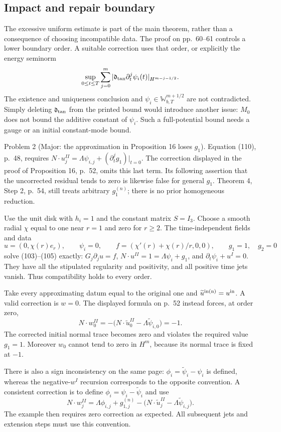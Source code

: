 \documentclass[10pt]{article}
\begin{document}
\subsection*{Impact and repair boundary}
The excessive uniform estimate is part of the main theorem, rather than a consequence of choosing incompatible data. The proof on pp. 60–61 controls a lower boundary order. A suitable correction uses that order, or explicitly the energy seminorm \[\sup_{0\le t\le T}\sum_{j=0}^{m}
 |\mathfrak d_{\rm tan}\partial_t^j\psi_i(t)|_{H^{m-j-1/2}}.\] The existence and uniqueness conclusion and \(\psi_i\in\mathbb W_{b,T}^{m+1/2}\) are not contradicted. Simply deleting \(\mathfrak d_{\rm tan}\) from the printed bound would introduce another issue: \(M_0\) does not bound the additive constant of \(\psi_i\). Such a full-potential bound needs a gauge or an initial constant-mode bound.\par
Problem 2 (Major: the approximation in Proposition 16 loses \(g_1\)).  Equation (110), p. 48, requires \(N\cdot u_j^{II}=\Lambda\psi_{i,j}
+(\partial_t^j g_1)|_{t=0}\). The correction displayed in the proof of Proposition 16, p. 52, omits this last term. Its following assertion that the uncorrected residual tends to zero is likewise false for general \(g_1\). Theorem 4, Step 2, p. 54, still treats arbitrary \(g_1^{(n)}\); there is no prior homogeneous reduction.\par
Use the unit disk with \(h_i=1\) and the constant matrix \(S=I_3\). Choose a smooth radial \(\chi\) equal to one near \(r=1\) and zero for \(r\ge2\). The time-independent fields and data \[u=(0,\chi(r)e_r),\qquad \psi_i=0,\qquad
 f=(\chi'(r)+\chi(r)/r,0,0),\qquad g_1=1,\quad g_2=0\] solve (103)–(105) exactly: \(G_j\partial_j u=f\), \(N\cdot u^{II}=1=\Lambda\psi_i+g_1\), and \(\partial_t\psi_i+u^I=0\). They have all the stipulated regularity and positivity, and all positive time jets vanish. Thus compatibility holds to every order.\par
Take every approximating datum equal to the original one and \(\widetilde u^{\rm in(n)}=u^{\rm in}\). A valid correction is \(w=0\). The displayed formula on p. 52 instead forces, at order zero, \[N\cdot w_0^{II}
  =-\bigl(N\cdot\widetilde u_0^{II}
                  -\Lambda\widetilde\psi_{i,0}\bigr)=-1.\] The corrected initial normal trace becomes zero and violates the required value \(g_1=1\). Moreover \(w_0\) cannot tend to zero in \(H^m\), because its normal trace is fixed at \(-1\).\par
There is also a sign inconsistency on the same page: \(\phi_i=\widetilde\psi_i-\psi_i\) is defined, whereas the negative-\(w^I\) recursion corresponds to the opposite convention. A consistent correction is to define \(\phi_i=\psi_i-\widetilde\psi_i\) and use \[N\cdot w_j^{II}=\Lambda\phi_{i,j}
 +g_{1,j}^{(n)}
 -\bigl(N\cdot\widetilde u_j^{II}
                     -\Lambda\widetilde\psi_{i,j}\bigr).\] The example then requires zero correction as expected. All subsequent jets and extension steps must use this convention.\par
\end{document}
